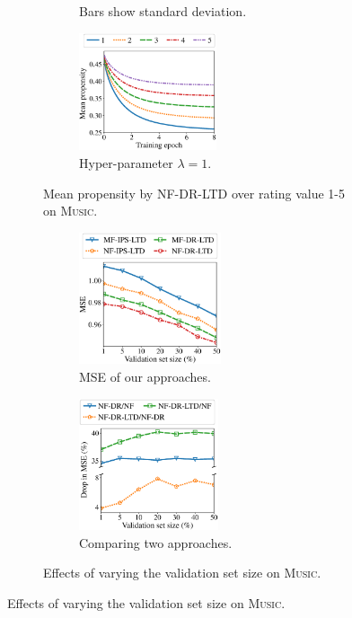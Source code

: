 \documentclass[letterpaper]{article} %
\newcommand{\regularization}{\lambda}
\begin{document}
\begin{figure}[!t]
\begin{minipage}[t]{1.090\linewidth}
\begin{figure}[H]
\begin{subfigure}{0.495\textwidth}
  \caption{Bars show standard deviation.}
  \label{fig:propensity rating}
\end{subfigure}
\hfill %
\begin{subfigure}{0.495\textwidth}
  \centering
  \includegraphics[height=3.46cm]{fig/propensity_epoch.eps}
  \caption{Hyper-parameter $\regularization=1$.}
  \label{fig:propensity epoch}
\end{subfigure}
\caption{Mean propensity by NF-DR-LTD over rating value 1-5 on \textsc{Music}.}
\end{figure}%
\end{minipage}
\hspace*{-0.44cm}
\begin{minipage}[t]{1.090\linewidth}
\centering
\begin{figure}[H]
\centering
\begin{subfigure}{0.495\textwidth}
  \centering
  \includegraphics[height=3.88cm]{fig/mse_unbiased_size.eps}
  \caption{MSE of our approaches.}
  \label{fig:validation set inaccuracy}
\end{subfigure}
\hfill %
\begin{subfigure}{0.495\textwidth}
  \centering
  \includegraphics[height=3.88cm]{fig/drop_unbiased_size.eps}
  \caption{Comparing two approaches.}
  \label{fig:validation set comparison}
\end{subfigure}
\caption{Effects of varying the validation set size on \textsc{Music}.}
\end{figure}%
\end{minipage}
\end{figure}
\end{document}
